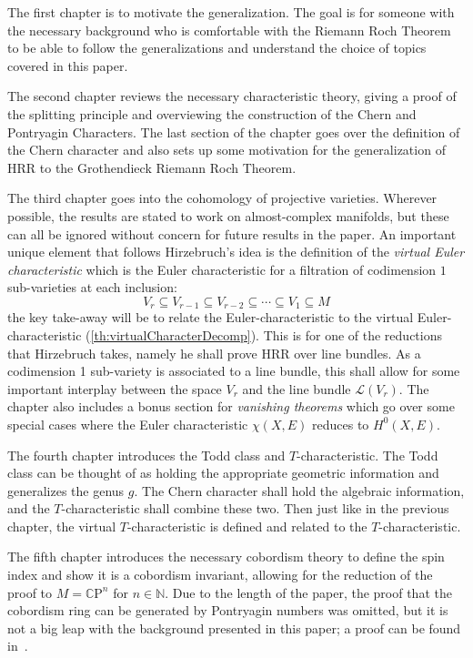\documentclass{ut-thesis}
\newcommand{\N}{{\mathbb{N}}}
\newcommand{\CL}{{\mathcal{L}}}
\newcommand{\CP}{{\mathbb{C}\mathrm{P}}}
\newcommand{\sse}{\subseteq}
\begin{document}
The first chapter is to motivate the generalization. The goal is for someone with the necessary background
who is comfortable with the Riemann Roch Theorem to be able to follow the generalizations and understand the
choice of topics covered in this paper.

The second chapter reviews the necessary characteristic theory, giving a proof of the splitting
principle and overviewing the construction of the Chern and Pontryagin Characters. The last section of the
chapter goes over the definition of the Chern character and also sets up some motivation for the
generalization of HRR to the Grothendieck Riemann Roch Theorem.

The third chapter goes into the cohomology of projective varieties. Wherever possible, the results are stated
to work on almost-complex manifolds, but these can all be ignored without concern for future results in the
paper. An important unique element that follows Hirzebruch's idea is the definition of the \emph{virtual Euler
characteristic} which is the Euler characteristic for a filtration of codimension $1$ sub-varieties at each
inclusion:
\[
  V_r \sse V_{r-1} \sse V_{r-2} \sse \cdots \sse V_1 \sse M
\]
the key take-away will be to relate the Euler-characteristic to the virtual Euler-characteristic
(\cref{th:virtualCharacterDecomp}). This is for one of the reductions that Hirzebruch takes, namely he shall
prove HRR over line bundles. As a codimension 1 sub-variety is associated to a line bundle, this shall allow
for some important interplay between the space $V_r$ and the line bundle $\CL(V_r)$. The chapter also includes
a bonus section for \emph{vanishing theorems} which go over some special cases where the Euler characteristic
$\chi(X,E)$ reduces to $H^0(X, E)$.

The fourth chapter introduces the Todd class and $T$-characteristic. The Todd class can be thought of as holding
the appropriate geometric information and generalizes the genus $g$. The Chern character shall hold the
algebraic information, and the $T$-characteristic shall combine these two. Then just like in the
previous chapter, the virtual $T$-characteristic is defined and related to the $T$-characteristic.

The fifth chapter introduces the necessary cobordism theory to define the spin index and show it is a cobordism
invariant, allowing for the reduction of the proof to $M = \CP^n$ for $n \in\N$. Due to the length of the
paper, the proof that the cobordism ring can be generated by Pontryagin numbers was omitted, but it is not
a big leap with the background presented in this paper; a proof can be found
in~\cite{hirzebruchTopologicalMethodsAlgebraic1995}.
\end{document}
